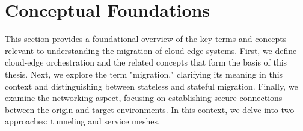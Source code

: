 %
\section{Conceptual Foundations}
\label{sec:conceptual-foundations}
%
This section provides a foundational overview of the key terms and concepts relevant to understanding the migration of cloud-edge systems. First, we define cloud-edge orchestration and the related concepts that form the basis of this thesis. Next, we explore the term "migration," clarifying its meaning in this context and distinguishing between stateless and stateful migration. Finally, we examine the networking aspect, focusing on establishing secure connections between the origin and target environments. In this context, we delve into two approaches: tunneling and service meshes.
%



